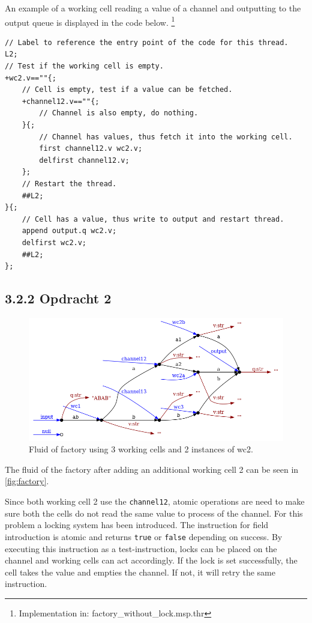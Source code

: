 \documentclass[a4paper,12px]{article}
\begin{document}
An example of a working cell reading a value of a channel and outputting to the
output queue is displayed in the code below. \footnote{Implementation in:
factory\_without\_lock.msp.thr}

\begin{verbatim}
// Label to reference the entry point of the code for this thread.
L2;
// Test if the working cell is empty.
+wc2.v==""{;
    // Cell is empty, test if a value can be fetched.
    +channel12.v==""{;
        // Channel is also empty, do nothing.
    }{;
        // Channel has values, thus fetch it into the working cell.
        first channel12.v wc2.v;
        delfirst channel12.v;
    };
    // Restart the thread.
    ##L2;
}{;
    // Cell has a value, thus write to output and restart thread.
    append output.q wc2.v;
    delfirst wc2.v;
    ##L2;
};
\end{verbatim}

\subsection{3.2.2 Opdracht 2}

\begin{figure}[h]
    \centering
    \includegraphics[width=\linewidth]{factory.png}
    \caption{Fluid of factory using 3 working cells and 2 instances of wc2.}
    \label{fig:factory}
\end{figure}
\FloatBarrier%
The fluid of the factory after adding an additional working cell 2 can be seen in \autoref{fig:factory}.

Since both working cell 2 use the \verb|channel12|, atomic operations are
need to make sure both the cells do not read the same value to process of the
channel. For this problem a locking system has been introduced. The instruction
for field introduction is atomic and returns \verb|true| or \verb|false|
depending on success. By executing this instruction as a test-instruction, locks
can be placed on the channel and working cells can act accordingly. If the lock
is set successfully, the cell takes the value and empties the channel. If not,
it will retry the same instruction.
\end{document}
